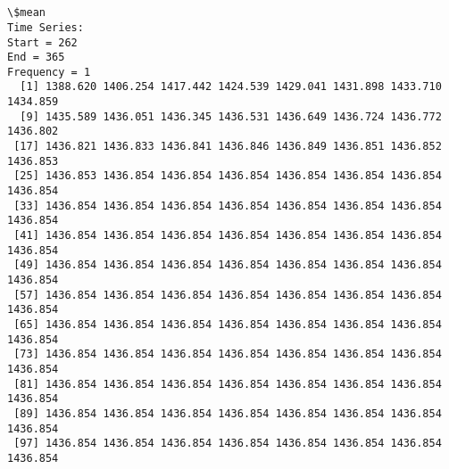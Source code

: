 \documentclass[11pt]{article}
\begin{document}
    \begin{center}
    \end{center}
    { \hspace*{\fill} \\}
    
    \begin{center}
    \end{center}
    { \hspace*{\fill} \\}
    
    \begin{Verbatim}[commandchars=\\\{\}]
\$mean
Time Series:
Start = 262 
End = 365 
Frequency = 1 
  [1] 1388.620 1406.254 1417.442 1424.539 1429.041 1431.898 1433.710 1434.859
  [9] 1435.589 1436.051 1436.345 1436.531 1436.649 1436.724 1436.772 1436.802
 [17] 1436.821 1436.833 1436.841 1436.846 1436.849 1436.851 1436.852 1436.853
 [25] 1436.853 1436.854 1436.854 1436.854 1436.854 1436.854 1436.854 1436.854
 [33] 1436.854 1436.854 1436.854 1436.854 1436.854 1436.854 1436.854 1436.854
 [41] 1436.854 1436.854 1436.854 1436.854 1436.854 1436.854 1436.854 1436.854
 [49] 1436.854 1436.854 1436.854 1436.854 1436.854 1436.854 1436.854 1436.854
 [57] 1436.854 1436.854 1436.854 1436.854 1436.854 1436.854 1436.854 1436.854
 [65] 1436.854 1436.854 1436.854 1436.854 1436.854 1436.854 1436.854 1436.854
 [73] 1436.854 1436.854 1436.854 1436.854 1436.854 1436.854 1436.854 1436.854
 [81] 1436.854 1436.854 1436.854 1436.854 1436.854 1436.854 1436.854 1436.854
 [89] 1436.854 1436.854 1436.854 1436.854 1436.854 1436.854 1436.854 1436.854
 [97] 1436.854 1436.854 1436.854 1436.854 1436.854 1436.854 1436.854 1436.854


\end{Verbatim}
\end{document}

